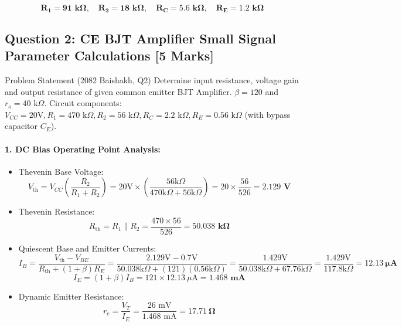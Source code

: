 \documentclass[11pt,a4paper,oneside]{book}
\begin{document}
\begin{answerbox}
$$\mathbf{R_1 = 91\text{ k}\Omega, \quad R_2 = 18\text{ k}\Omega, \quad R_C = 5.6\text{ k}\Omega, \quad R_E = 1.2\text{ k}\Omega}$$
\end{answerbox}

\vspace{0.6cm}

\subsection{Question 2: CE BJT Amplifier Small Signal Parameter Calculations [5 Marks]}
\begin{questionbox}{Problem Statement (2082 Baishakh, Q2)}
Determine input resistance, voltage gain and output resistance of given common emitter BJT Amplifier. $\beta = 120$ and $r_o = 40\text{ k}\Omega$.
Circuit components: $V_{CC} = 20\text{V}, R_1 = 470\text{ k}\Omega, R_2 = 56\text{ k}\Omega, R_C = 2.2\text{ k}\Omega, R_E = 0.56\text{ k}\Omega$ (with bypass capacitor $C_E$).
\end{questionbox}

\paragraph{1. DC Bias Operating Point Analysis:}
\begin{itemize}[leftmargin=1.5em]
  \item Thevenin Base Voltage:
  \[
  V_{\text{th}} = V_{CC} \left(\frac{R_2}{R_1 + R_2}\right) = 20\text{V} \times \left(\frac{56\text{k}\Omega}{470\text{k}\Omega + 56\text{k}\Omega}\right) = 20 \times \frac{56}{526} = \mathbf{2.129\text{ V}}
  \]
  \item Thevenin Resistance:
  \[
  R_{\text{th}} = R_1 \parallel R_2 = \frac{470 \times 56}{526} = \mathbf{50.038\text{ k}\Omega}
  \]
  \item Quiescent Base and Emitter Currents:
  \[
  I_B = \frac{V_{\text{th}} - V_{BE}}{R_{\text{th}} + (1+\beta)R_E} = \frac{2.129\text{V} - 0.7\text{V}}{50.038\text{k}\Omega + (121)(0.56\text{k}\Omega)} = \frac{1.429\text{V}}{50.038\text{k}\Omega + 67.76\text{k}\Omega} = \frac{1.429\text{V}}{117.8\text{k}\Omega} = \mathbf{12.13\ \mu\text{A}}
  \]
  \[
  I_E = (1+\beta)I_B = 121 \times 12.13\ \mu\text{A} = \mathbf{1.468\text{ mA}}
  \]
  \item Dynamic Emitter Resistance:
  \[
  r_e = \frac{V_T}{I_E} = \frac{26\text{ mV}}{1.468\text{ mA}} = \mathbf{17.71\ \Omega}
  \]
\end{itemize}
\end{document}
